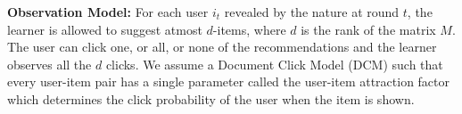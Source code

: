 %
%
%



\textbf{Observation Model:} For each user $i_t$ revealed by the nature at round $t$, the learner is allowed to suggest atmost $d$-items, where $d$ is the rank of the matrix $M$. The user can click one, or all, or none of the recommendations and the learner observes all the $d$ clicks. We assume a Document Click Model (DCM) \citep{craswell2008experimental} such that every user-item pair has a single parameter called the user-item attraction factor which determines the click probability of the user when the item is shown.  

